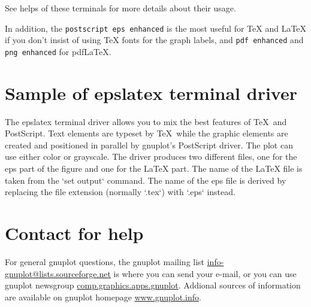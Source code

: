 See helps of these terminals for more details about their usage.

In addition, the \texttt{postscript eps enhanced} is the most useful for \TeX{}
and \LaTeX{} if you don't insist of using \TeX{} fonts for the graph labels, and
\texttt{pdf enhanced} and \texttt{png enhanced} for pdf\LaTeX{}.

\section{Sample of epslatex terminal driver}
\label{epslatex}

The epslatex terminal driver allows you to mix the best features of \TeX\
and PostScript. Text elements are typeset by \TeX\, while the graphic
elements are created and positioned in parallel by gnuplot's PostScript
driver. The plot can use either color or grayscale.
The driver produces two different files, one for the eps part of the figure
and one for the \LaTeX{} part. The name of the \LaTeX{} file is taken from the
`set output` command. The name of the eps file is derived by replacing
the file extension (normally `.tex`) with `.eps` instead.



\section{Contact for help}

For general gnuplot questions, the gnuplot mailing list
\url{info-gnuplot@lists.sourceforge.net} is where you can send your e-mail, or
you can use gnuplot newsgroup \url{comp.graphics.apps.gnuplot}. Addional sources
of information are available on gnuplot homepage \url{www.gnuplot.info}.


